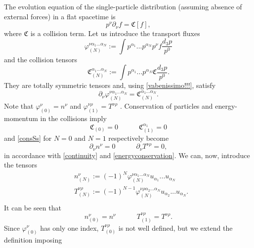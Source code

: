 \documentclass[useAMS,usenatbib,prd,twocolumn,nofootinbib]{revtex4-1}
\newcommand{\spc}{\quad \quad \quad}
\begin{document}
The evolution equation of the single-particle distribution (assuming absence of external forces) in a flat spacetime is \citep{cercignani_book}
\begin{equation}\label{vabenissimo!!!}
p^\nu \partial_\nu f = \mathfrak{C}[f],
\end{equation}
where $\mathfrak{C}$ is a collision term. Let us introduce the transport fluxes
\begin{equation}
\varphi_{(N)}^{\nu \alpha_1 ... \alpha_N} := \int p^{\alpha_1}...p^{\alpha_N} p^\nu f \dfrac{d_3 p}{p^0}
\end{equation}
and the collision tensors
\begin{equation}
\mathfrak{C}_{(N)}^{\alpha_1 ... \alpha_N}:= \int  p^{\alpha_1}...p^{\alpha_N} \mathfrak{C} \dfrac{d_3 p}{p^0}.
\end{equation}
They are totally symmetric tensors and, using \eqref{vabenissimo!!!}, satisfy
\begin{equation}\label{consSs}
\partial_\nu \varphi_{(N)}^{\nu \alpha_1 ... \alpha_N} = \mathfrak{C}_{(N)}^{\alpha_1 ... \alpha_N}.
\end{equation}
Note that $\varphi_{(0)}^\nu =n^\nu$ and $\varphi_{(1)}^{\nu \rho} =T^{\nu \rho}$ \citep{cercignani_book}. Conservation of particles and energy-momentum in the collisions imply 
\begin{equation}
\mathfrak{C}_{(0)}=0  \spc \mathfrak{C}_{(1)}^{\alpha_1}=0
\end{equation}
and \eqref{consSs} for $N=0$ and $N=1$ respectively become 
\begin{equation}
\partial_\nu n^\nu =0  \spc  \partial_\nu T^{\nu \rho}=0,
\end{equation}
in accordance with \eqref{continuity} and \eqref{energyconservation}. We can, now, introduce the tensors
\begin{equation}\label{DdD}
\begin{split}
& n_{(N)}^\nu := (-1)^N \varphi_{(N)}^{\nu \alpha_1 ... \alpha_N}  u_{\alpha_1}... u_{\alpha_N} \\
& T^{\nu \rho}_{(N)} := (-1)^{N-1} \varphi_{(N)}^{\nu \rho \alpha_2 ... \alpha_N}  u_{\alpha_2}... u_{\alpha_N}. \\
\end{split}
\end{equation}
It can be seen that
\begin{equation}
n_{(0)}^\nu = n^\nu  \spc  T_{(1)}^{\nu \rho} = T^{\nu \rho}.
\end{equation}
Since $\varphi_{(0)}^\nu$ has only one index, $T_{(0)}^{\nu \rho}$ is not well defined, but we extend the definition imposing 
\end{document}
